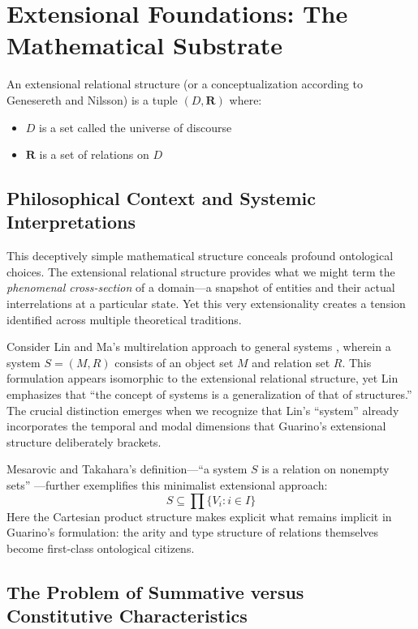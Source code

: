 \section{Extensional Foundations: The Mathematical Substrate}

\begin{definition}
	An extensional relational structure (or a conceptualization according to Genesereth and Nilsson) is a tuple $(D, \mathbf{R})$ where:
	\begin{itemize}
		\item $D$ is a set called the universe of discourse
		\item $\mathbf{R}$ is a set of relations on $D$
	\end{itemize}
\end{definition}

\subsection{Philosophical Context and Systemic Interpretations}

This deceptively simple mathematical structure conceals profound ontological choices. The extensional relational structure provides what we might term the \emph{phenomenal cross-section} of a domain—a snapshot of entities and their actual interrelations at a particular state. Yet this very extensionality creates a tension identified across multiple theoretical traditions.

Consider Lin and Ma's multirelation approach to general systems \cite{Lin1987}, wherein a system $S = (M, R)$ consists of an object set $M$ and relation set $R$. This formulation appears isomorphic to the extensional relational structure, yet Lin emphasizes that ``the concept of systems is a generalization of that of structures.'' The crucial distinction emerges when we recognize that Lin's ``system'' already incorporates the temporal and modal dimensions that Guarino's extensional structure deliberately brackets.

Mesarovic and Takahara's definition—``a system $S$ is a relation on nonempty sets'' \cite{Mesarovic1975}—further exemplifies this minimalist extensional approach:
$$S \subseteq \prod\{V_i : i \in I\}$$
Here the Cartesian product structure makes explicit what remains implicit in Guarino's formulation: the arity and type structure of relations themselves become first-class ontological citizens.

\subsection{The Problem of Summative versus Constitutive Characteristics}

